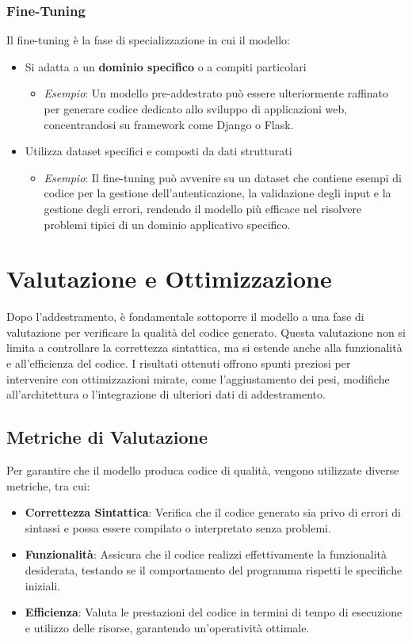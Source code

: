 \documentclass[12pt,a4paper,openright,twoside]{book}
\begin{document}
\subsubsection{Fine-Tuning}
Il fine-tuning è la fase di specializzazione in cui il modello:
\begin{itemize}
    \item Si adatta a un \textbf{dominio specifico} o a compiti particolari
        \begin{itemize}
            \item \textit{Esempio}: Un modello pre-addestrato può essere ulteriormente raffinato per generare codice dedicato allo sviluppo di applicazioni web, concentrandosi su framework come Django o Flask.
        \end{itemize}
    \item Utilizza dataset specifici e composti da dati strutturati
        \begin{itemize}
            \item \textit{Esempio}: Il fine-tuning può avvenire su un dataset che contiene esempi di codice per la gestione dell’autenticazione, la validazione degli input e la gestione degli errori, rendendo il modello più efficace nel risolvere problemi tipici di un dominio applicativo specifico.
        \end{itemize}
\end{itemize}
\section{Valutazione e Ottimizzazione}
Dopo l'addestramento, è fondamentale sottoporre il modello a una fase di valutazione per verificare la qualità del codice generato. Questa valutazione non si limita a controllare la correttezza sintattica, ma si estende anche alla funzionalità e all'efficienza del codice. I risultati ottenuti offrono spunti preziosi per intervenire con ottimizzazioni mirate, come l'aggiustamento dei pesi, modifiche all'architettura o l'integrazione di ulteriori dati di addestramento.

\subsection{Metriche di Valutazione}
Per garantire che il modello produca codice di qualità, vengono utilizzate diverse metriche, tra cui:
\begin{itemize}
    \item \textbf{Correttezza Sintattica}: Verifica che il codice generato sia privo di errori di sintassi e possa essere compilato o interpretato senza problemi.
    \item \textbf{Funzionalità}: Assicura che il codice realizzi effettivamente la funzionalità desiderata, testando se il comportamento del programma rispetti le specifiche iniziali.
    \item \textbf{Efficienza}: Valuta le prestazioni del codice in termini di tempo di esecuzione e utilizzo delle risorse, garantendo un'operatività ottimale.
\end{itemize}
\end{document}
